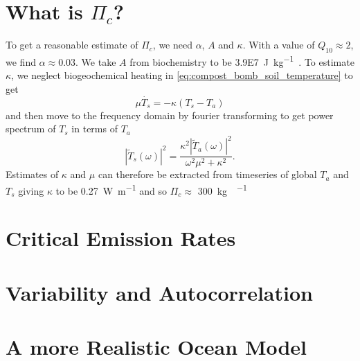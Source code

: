 \section{What is $\Pi_c$?}
To get a reasonable estimate of $\Pi_c$, we need $\alpha$, $A$ and $\kappa$. With a value of $Q_{10} \approx 2$, we find $\alpha \approx 0.03$.
We take $A$ from biochemistry to be \SI{3.9E7}{\joule\per\kilo\gram\carbon}. To estimate $\kappa$, we neglect biogeochemical heating
in \ref{eq:compost_bomb_soil_temperature} to get
\begin{equation}
  \label{eq:soil_temp_no_biogeo}
  \mu \dot{T_s} = -\kappa \left( T_s -T_a \right)
\end{equation}
and then move to the frequency domain by fourier transforming to get power spectrum of $T_s$ in terms of $T_a$
\begin{equation}
  \label{eq:power_spectrum_of_Ts}
  \left| \tilde{T}_s\left(\omega\right)\right|^2 = \frac{\kappa^2 \left| \tilde{T}_a\left(\omega\right)\right|^2}{\omega^2 \mu^2 + \kappa^2}.
    \end{equation}
Estimates of $\kappa$ and $\mu$ can therefore be extracted from timeseries of global $T_a$ and $T_s$ giving $\kappa$ to be \SI{0.27}{\watt\per\meter}
and so $\Pi_c \approx$ \SI{300}{\kilo\gram\carbon\per\year}
\section{Critical Emission Rates}

\section{Variability and Autocorrelation}

\section{A more Realistic Ocean Model}